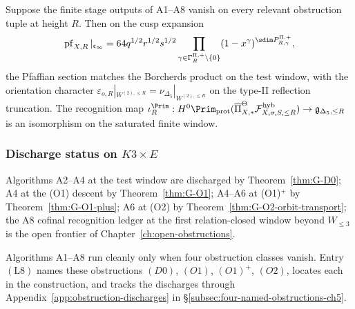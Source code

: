 \begin{theorem}
\label{thm:pfaffian-dirac-finite-stage}
Suppose the finite stage outputs of A1--A8 vanish on every relevant
obstruction tuple at height $R$.  Then on the cusp expansion
\[
\operatorname{pf}_{X,R}|_{\mathfrak c_\infty}
=64q^{1/2}r^{1/2}s^{1/2}\prod_{\gamma\in\Gamma_R^{\Pi,+}\setminus\{0\}}
(1-x^\gamma)^{\sdim P^{\Pi,+}_{R,\gamma}},
\]
the Pfaffian section matches the Borcherds product on the test
window, with the orientation character
$\varepsilon_{o,R}|_{W^{(2),\le R}}=\nu_{\Delta_5}|_{W^{(2),\le R}}$
on the type-II reflection truncation.  The recognition map
$\iota_R^{\Prim}:H^0\Prim_{\mathrm{prot}}(\overline\Pi_{X,*}^\Theta
\mathcal F_{X,\sigma,S,\le R}^{\mathrm{hyb}})\to\mathfrak g_{\Delta_5,\le R}$
is an isomorphism on the saturated finite window.
\end{theorem}

\subsubsection*{Discharge status on \(K3\times E\)}

Algorithms A2--A4 at the test window are discharged by
Theorem~\ref{thm:G-D0}; A4 at the (O1) descent by
Theorem~\ref{thm:G-O1}; A4--A6 at (O1)$^+$ by
Theorem~\ref{thm:G-O1-plus}; A6 at (O2) by
Theorem~\ref{thm:G-O2-orbit-transport}; the A8 cofinal recognition
ledger at the first relation-closed window beyond $W_{\le 3}$ is the
open frontier of Chapter~\ref{ch:open-obstructions}.

Algorithms A1--A8 run cleanly only when four obstruction classes
vanish.  Entry $(\mathrm L 8)$ names these obstructions $(D0)$,
$(O1)$, $(O1)^+$, $(O2)$, locates each in the construction, and
tracks the discharges through
Appendix~\ref{app:obstruction-discharges} in
\S\ref{subsec:four-named-obstructions-ch5}.
